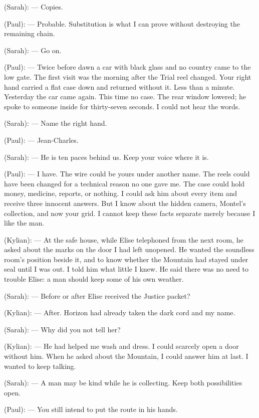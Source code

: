 \begin{room}
(Sarah): --- Copies.

(Paul): --- Probable. Substitution is what I can prove without destroying the remaining chain.

(Sarah): --- Go on.

(Paul): --- Twice before dawn a car with black glass and no country came to the low gate. The first visit was the morning after the Trial reel changed. Your right hand carried a flat case down and returned without it. Less than a minute. Yesterday the car came again. This time no case. The rear window lowered; he spoke to someone inside for thirty-seven seconds. I could not hear the words.

(Sarah): --- Name the right hand.

(Paul): --- Jean-Charles.

\centerline{}

(Sarah): --- He is ten paces behind us. Keep your voice where it is.

(Paul): --- I have. The wire could be yours under another name. The reels could have been changed for a technical reason no one gave me. The case could hold money, medicine, reports, or nothing. I could ask him about every item and receive three innocent answers. But I know about the hidden camera, Montel's collection, and now your grid. I cannot keep these facts separate merely because I like the man.

(Kylian): --- At the safe house, while Elise telephoned from the next room, he asked about the marks on the door I had left unopened. He wanted the soundless room's position beside it, and to know whether the Mountain had stayed under seal until I was out. I told him what little I knew. He said there was no need to trouble Elise: a man should keep some of his own weather.

(Sarah): --- Before or after Elise received the Justice packet?

(Kylian): --- After. Horizon had already taken the dark cord and my name.

(Sarah): --- Why did you not tell her?

(Kylian): --- He had helped me wash and dress. I could scarcely open a door without him. When he asked about the Mountain, I could answer him at last. I wanted to keep talking.

(Sarah): --- A man may be kind while he is collecting. Keep both possibilities open.

(Paul): --- You still intend to put the route in his hands.


\end{room}
